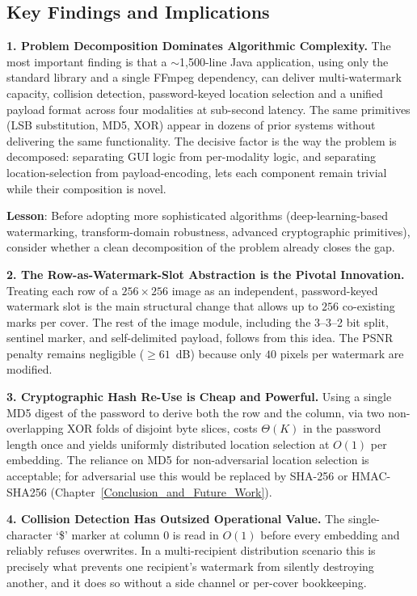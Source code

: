 \subsection{Key Findings and Implications}

\textbf{1. Problem Decomposition Dominates Algorithmic Complexity.} The most important finding is that a $\sim$1{,}500-line Java application, using only the standard library and a single FFmpeg dependency, can deliver multi-watermark capacity, collision detection, password-keyed location selection and a unified payload format across four modalities at sub-second latency. The same primitives (LSB substitution, MD5, XOR) appear in dozens of prior systems without delivering the same functionality. The decisive factor is the way the problem is decomposed: separating GUI logic from per-modality logic, and separating location-selection from payload-encoding, lets each component remain trivial while their composition is novel.

\textbf{Lesson}: Before adopting more sophisticated algorithms (deep-learning-based watermarking, transform-domain robustness, advanced cryptographic primitives), consider whether a clean decomposition of the problem already closes the gap.

\textbf{2. The Row-as-Watermark-Slot Abstraction is the Pivotal Innovation.} Treating each row of a $256 \times 256$ image as an independent, password-keyed watermark slot is the main structural change that allows up to $256$ co-existing marks per cover. The rest of the image module, including the 3--3--2 bit split, sentinel marker, and self-delimited payload, follows from this idea. The PSNR penalty remains negligible ($\ge 61$~dB) because only $40$ pixels per watermark are modified.

\textbf{3. Cryptographic Hash Re-Use is Cheap and Powerful.} Using a single MD5 digest of the password to derive both the row and the column, via two non-overlapping XOR folds of disjoint byte slices, costs $\Theta(K)$ in the password length once and yields uniformly distributed location selection at $O(1)$ per embedding. The reliance on MD5 for non-adversarial location selection is acceptable; for adversarial use this would be replaced by SHA-256 or HMAC-SHA256 (Chapter~\ref{Conclusion_and_Future_Work}).

\textbf{4. Collision Detection Has Outsized Operational Value.} The single-character `\$' marker at column $0$ is read in $O(1)$ before every embedding and reliably refuses overwrites. In a multi-recipient distribution scenario this is precisely what prevents one recipient's watermark from silently destroying another, and it does so without a side channel or per-cover bookkeeping.

